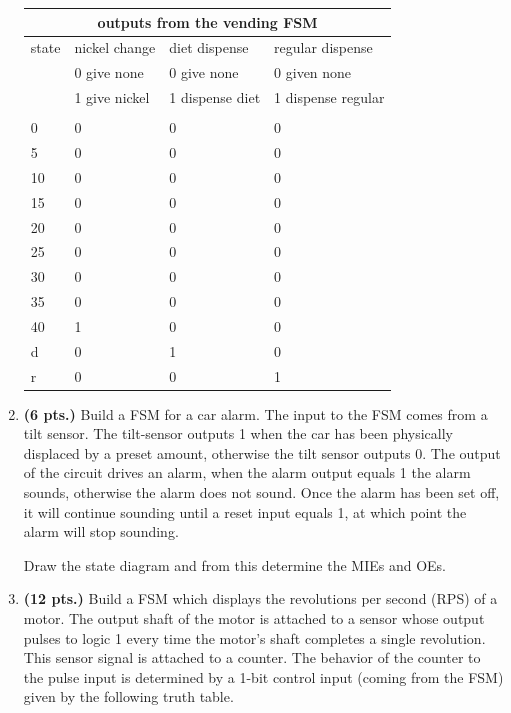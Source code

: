 \begin{enumerate}
\begin{onlysolution}
{\begin{tabular}{|l||l|l|l|} \hline
\multicolumn{4}{|c|}{outputs from the vending FSM}              \\ \hline \hline
state & nickel change	& diet dispense & regular dispense      \\ \hline
      & 0 give none	& 0 give none	& 0 given none		\\ \hline
      & 1 give nickel	& 1 dispense diet & 1 dispense regular	\\ \hline
      & 		&		&			\\ \hline
0     & 0		& 0		& 0			\\ \hline
5     & 0		& 0		& 0			\\ \hline
10    & 0		& 0		& 0			\\ \hline
15    & 0		& 0		& 0			\\ \hline
20    & 0		& 0		& 0			\\ \hline
25    & 0		& 0		& 0			\\ \hline
30    & 0		& 0		& 0			\\ \hline
35    & 0		& 0		& 0			\\ \hline
40    & 1		& 0		& 0			\\ \hline
d     & 0		& 1		& 0			\\ \hline
r     & 0		& 0		& 1			\\ \hline
\end{tabular}
}\end{onlysolution} 



\item \textbf{ (6 pts.)}
Build a FSM for a car alarm.  The input to the FSM
comes from a tilt sensor.  The tilt-sensor outputs 1 when the 
car has been physically displaced by a preset amount, otherwise the
tilt sensor outputs 0.  The output of the circuit drives an alarm,
when the alarm output equals 1 the alarm sounds, otherwise the alarm
does not sound.  Once the alarm has been set off, it will continue
sounding until a reset input equals 1, at which point the alarm will
stop sounding.

Draw the state diagram and from this determine the MIEs and OEs.


\item \textbf{ (12 pts.)}
Build a FSM which displays the revolutions per second
(RPS) of a motor.  The output shaft of the motor is attached to 
a sensor whose output pulses to logic 1 every time the motor's shaft
completes a single revolution.  This sensor signal is attached to
a counter.  The behavior of the counter to the pulse input is determined
by a 1-bit control input (coming from the FSM) given by the following 
truth table.


\end{enumerate}
